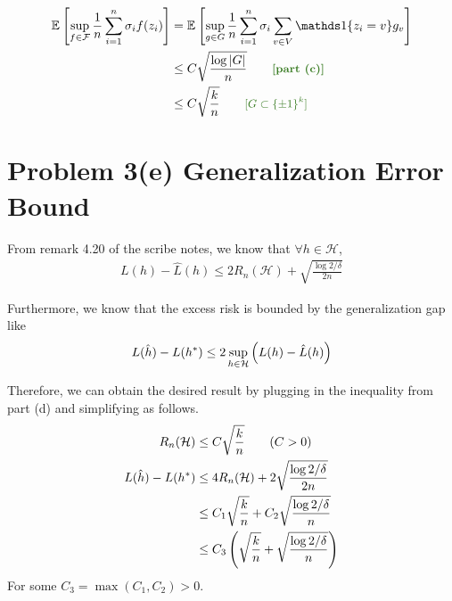 \documentclass[11pt]{article}
\newcommand{\1}{\mathbb{I}} %
\begin{document}
\begin{align}
	\E{\sup_{f \in \mathcal F}  \inv{n} \insum \sigma_i f(z_i)  } 
		&= \E{\sup_{g \in G} \inv{n} \insum \sigma_i \sum_{v \in V}  \ind\{  z_i = v  \} g_v   } \\
		&\leq C \sqrt{  \frac{\log |G| }{ n } } \qquad \mtgreen{[part (c)]} \\
		&\leq C \sqrt{ \frac{k}{n}  } \qquad \mgreen{[G \subset \{ \pm 1 \}^{k}]}
\end{align}






\clearpage 
\section*{Problem 3(e) Generalization Error Bound}


From remark 4.20 of the scribe notes, we know that $\forall h \in \mathcal H$,
\begin{align}
	L(h) - \hat L(h) \leq 2R_n(\mathcal H) + \sqrt{   \frac{ \log{2/\delta} }{2n}   }
\end{align}

Furthermore, we know that the excess risk is bounded by the generalization gap like
\begin{align}
	L(\hat h) - L(h^*) \leq 2 \sup_{h \in \mathcal H}\left(  L(h) - \hat L(h)  \right)
\end{align}

Therefore, we can obtain the desired result by plugging in the inequality from part (d) and simplifying as follows. 
\begin{align}
	R_n(\mathcal H) &\leq C \sqrt{  \frac{k}{n} } \qquad (C > 0) \\
	L(\hat h) - L(h^*) 
		&\leq 4 R_n(\mathcal H) + 2 \sqrt{   \frac{ \log{2/\delta} }{2n}   } \\
		&\leq C_1  \sqrt{  \frac{k}{n} }  + C_2 \sqrt{   \frac{ \log{2/\delta} }{n}   }  \\
		&\leq C_3 \left(    \sqrt{  \frac{k}{n} }  + \sqrt{   \frac{ \log{2/\delta} }{n}   }  \right)
\end{align}
For some $C_3 = \max (C_1, C_2) > 0$.  
\end{document}
